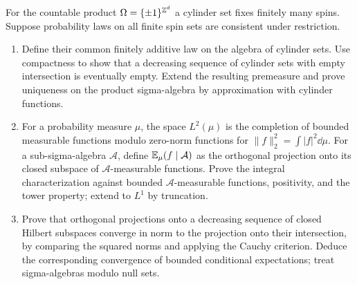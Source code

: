 \begin{exercise}
For the countable product $\Omega=\{\pm1\}^{\mathbb Z^d}$ a cylinder
set fixes finitely many spins. Suppose probability laws on all
finite spin sets are consistent under restriction.
\begin{enumerate}[label=(\alph*)]
\item Define their common finitely additive law on the algebra
of cylinder sets. Use compactness to show that a decreasing
sequence of cylinder sets with empty intersection is
eventually empty. Extend the resulting premeasure and prove
uniqueness on the product sigma-algebra by approximation
with cylinder functions.
\item For a probability measure $\mu$, the space
$L^2(\mu)$ is the completion of bounded measurable functions
modulo zero-norm functions for
$\|f\|_2^2=\int|f|^2\dd\mu$.
For a sub-sigma-algebra $\mathcal A$, define
$\mathbb E_\mu(f\mid\mathcal A)$ as the orthogonal projection
onto its closed subspace of $\mathcal A$-measurable functions.
Prove the integral characterization against bounded
$\mathcal A$-measurable functions, positivity, and the tower
property; extend to $L^1$ by truncation.
\item Prove that orthogonal projections onto a decreasing
sequence of closed Hilbert subspaces converge in norm to
the projection onto their intersection, by comparing the
squared norms and applying the Cauchy criterion.
Deduce the corresponding convergence of bounded conditional
expectations; treat sigma-algebras modulo null sets.
\end{enumerate}
\end{exercise}

